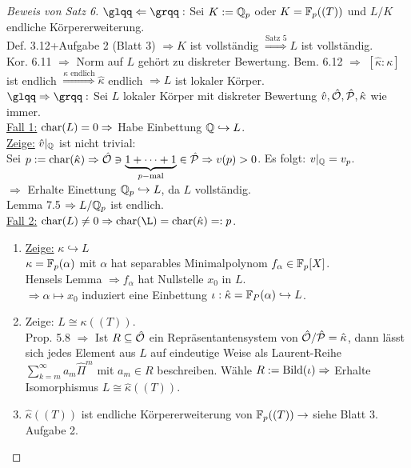 \begin{proof}[Beweis von Satz 6]
$\glqq \Leftarrow \grqq:$ Sei $K:=\mathbb{Q}_p$ oder $K=\mathbb{F}_p((T))$ und $L/K$ endliche Körpererweiterung.\\
Def. 3.12+Aufgabe 2 (Blatt 3) $\Rightarrow K$ ist vollständig $\stackrel{\text{Satz 5}}{\Longrightarrow} L$ ist vollständig.\\
Kor. 6.11 $\Rightarrow$ Norm auf $L$ gehört zu diskreter Bewertung.
Bem. 6.12 $\Rightarrow$ $[\hat \kappa: \kappa]$ ist endlich $\stackrel{\kappa \text{ endlich}}{\Longrightarrow} \hat \kappa$ endlich $\Rightarrow L$ ist lokaler Körper.\\
$\glqq \Rightarrow\grqq:$ Sei $L$ lokaler Körper mit diskreter Bewertung $\hat v, \hat{\mathcal{O}}, \hat{\mathcal{P}}, \hat \kappa$ wie immer.\\
\underline{Fall 1:} $\operatorname{char}(L)=0 \Rightarrow$ Habe Einbettung $\mathbb{Q} \hookrightarrow L$.\\
\underline{Zeige:} $\hat{v}|_{\mathbb{Q}}$ ist nicht trivial:\\
Sei $p:=\operatorname{char}(\hat{\kappa}) \Rightarrow \hat{\mathcal{O}} \ni \underbrace{1+\dots+1}_{p-\text{mal}} \in \hat{\mathcal{P}} \Rightarrow v(p) >0$. Es folgt: $v|_{\mathbb{Q}}=v_p$.\\
$\Rightarrow$ Erhalte Einettung $\mathbb{Q}_p \hookrightarrow L$, da $L$ vollständig.\\
Lemma 7.5 $\Rightarrow L/\mathbb{Q}_p$ ist endlich.\\

\underline{Fall 2:} $\ch(L)\neq 0 \Rightarrow \ch(\L)=\ch(\hat \kappa)=:p$.\\
\begin{enumerate}[(1)]
\item \underline{Zeige:} $\kappa \hookrightarrow L$\\
$\kappa = \mathbb{F}_p(\alpha)$ mit $\alpha$ hat separables Minimalpolynom $f_\alpha \in \mathbb{F}_p[X]$.\\
Hensels Lemma $\Rightarrow f_\alpha$ hat Nullstelle $x_0$ in $L$.\\
$\Rightarrow \alpha \mapsto x_0$ induziert eine Einbettung $\iota: \hat \kappa = \mathbb{F}_P(\alpha) \hookrightarrow L$.
\item Zeige: $L \cong \kappa((T))$.\\
Prop. 5.8 $\Rightarrow$ Ist $R \subseteq \hat{\mathcal{O}}$ ein Repräsentantensystem von $\hat{\mathcal{O}}/\hat{\mathcal{P}}=\hat \kappa$, dann lässt sich jedes Element aus $L$ auf eindeutige Weise als Laurent-Reihe $\sum_{k=m}^\infty a_m \hat{\Pi}^m$ mit $a_m \in R$ beschreiben. Wähle $R:=\operatorname{Bild}(\iota) \Rightarrow$ Erhalte Isomorphismus $L \cong \hat{\kappa}((T))$.
\item $\hat \kappa((T))$ ist endliche Körpererweiterung von $\mathbb{F}_p((T)) \rightarrow$ siehe Blatt 3. Aufgabe 2.
\end{enumerate}
\end{proof}

